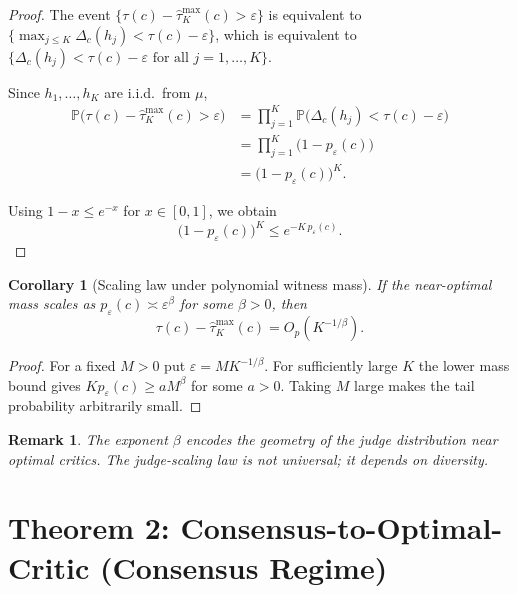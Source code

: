 \documentclass[11pt]{article}
\newtheorem{corollary}[theorem]{Corollary}
\newtheorem{remark}[theorem]{Remark}
\newcommand{\Prob}{\mathbb{P}}
\begin{document}
\begin{proof}
The event $\{\tau(c) - \hat\tau^{\max}_K(c) > \varepsilon\}$ is equivalent
to $\{\max_{j \le K} \Delta_c(h_j) < \tau(c) - \varepsilon\}$, which is
equivalent to $\{\Delta_c(h_j) < \tau(c) - \varepsilon \text{ for all }
j = 1, \ldots, K\}$.

Since $h_1, \ldots, h_K$ are i.i.d.\ from $\mu$,
\begin{align}
\Prob\!\big(\tau(c) - \hat\tau^{\max}_K(c) > \varepsilon\big)
&= \prod_{j=1}^K \Prob\!\big(\Delta_c(h_j) < \tau(c) - \varepsilon\big) \\
&= \prod_{j=1}^K \big(1 - p_\varepsilon(c)\big) \\
&= \big(1 - p_\varepsilon(c)\big)^K.
\end{align}

Using $1 - x \le e^{-x}$ for $x \in [0,1]$, we obtain
\begin{equation}
\big(1 - p_\varepsilon(c)\big)^K \le e^{-K \, p_\varepsilon(c)}.
\end{equation}
\end{proof}

\begin{corollary}[Scaling law under polynomial witness mass]
\label{cor:scaling-law-coverage}
If the near-optimal mass scales as $p_\varepsilon(c) \asymp \varepsilon^\beta$
for some $\beta > 0$, then
\begin{equation}
\tau(c) - \hat\tau^{\max}_K(c) = O_p(K^{-1/\beta}).
\end{equation}
\end{corollary}

\begin{proof}
For a fixed $M>0$ put $\varepsilon=M K^{-1/\beta}$. For sufficiently large $K$ the lower mass bound gives $Kp_\varepsilon(c)\ge aM^\beta$ for some $a>0$. Taking $M$ large makes the tail probability arbitrarily small.
\end{proof}

\begin{remark}
The exponent $\beta$ encodes the geometry of the judge distribution near
optimal critics. The judge-scaling law is \emph{not} universal; it depends
on diversity.
\end{remark}

\section{Theorem 2: Consensus-to-Optimal-Critic (Consensus Regime)}
\label{sec:consensus}
\end{document}
